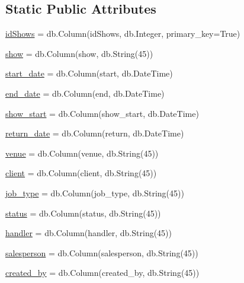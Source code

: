 \subsection*{Static Public Attributes}
\begin{DoxyCompactItemize}
\item 
\hyperlink{class_web_content_1_1classes_1_1_shows_a9ed1265f6e8a1078de474691f846f793}{id\+Shows} = db.\+Column(\textquotesingle{}id\+Shows\textquotesingle{}, db.\+Integer, primary\+\_\+key=True)
\item 
\hyperlink{class_web_content_1_1classes_1_1_shows_aec2efee9bcdad6b3a4732d6327d7f25c}{show} = db.\+Column(\textquotesingle{}show\textquotesingle{}, db.\+String(45))
\item 
\hyperlink{class_web_content_1_1classes_1_1_shows_a6c17ca935d1ab7bce12c2ad5a55bfd0e}{start\+\_\+date} = db.\+Column(\textquotesingle{}start\textquotesingle{}, db.\+Date\+Time)
\item 
\hyperlink{class_web_content_1_1classes_1_1_shows_a8e22ab3d1b30b350f3464bcd61b3ab8a}{end\+\_\+date} = db.\+Column(\textquotesingle{}end\textquotesingle{}, db.\+Date\+Time)
\item 
\hyperlink{class_web_content_1_1classes_1_1_shows_ad70665816e2050b3176e90e95655f3fb}{show\+\_\+start} = db.\+Column(\textquotesingle{}show\+\_\+start\textquotesingle{}, db.\+Date\+Time)
\item 
\hyperlink{class_web_content_1_1classes_1_1_shows_aee5eee42b3d279a14f401c113d79083c}{return\+\_\+date} = db.\+Column(\textquotesingle{}return\textquotesingle{}, db.\+Date\+Time)
\item 
\hyperlink{class_web_content_1_1classes_1_1_shows_ac931bd921ecb35a0e221ff9133162d2c}{venue} = db.\+Column(\textquotesingle{}venue\textquotesingle{}, db.\+String(45))
\item 
\hyperlink{class_web_content_1_1classes_1_1_shows_ad95c8895e4633584f7da017e2b79f45d}{client} = db.\+Column(\textquotesingle{}client\textquotesingle{}, db.\+String(45))
\item 
\hyperlink{class_web_content_1_1classes_1_1_shows_ae5f65ed709a0218f1298610e91500719}{job\+\_\+type} = db.\+Column(\textquotesingle{}job\+\_\+type\textquotesingle{}, db.\+String(45))
\item 
\hyperlink{class_web_content_1_1classes_1_1_shows_ae116171a1ecb47ad43e5631115fe9f43}{status} = db.\+Column(\textquotesingle{}status\textquotesingle{}, db.\+String(45))
\item 
\hyperlink{class_web_content_1_1classes_1_1_shows_a23219663a5b011841e8054fc6ca88e0f}{handler} = db.\+Column(\textquotesingle{}handler\textquotesingle{}, db.\+String(45))
\item 
\hyperlink{class_web_content_1_1classes_1_1_shows_a59168ff70138cf3bafb49d58bc7e4cbe}{salesperson} = db.\+Column(\textquotesingle{}salesperson\textquotesingle{}, db.\+String(45))
\item 
\hyperlink{class_web_content_1_1classes_1_1_shows_a1c11f5ef467e4230b4672c40cd7268fe}{created\+\_\+by} = db.\+Column(\textquotesingle{}created\+\_\+by\textquotesingle{}, db.\+String(45))
\end{DoxyCompactItemize}


